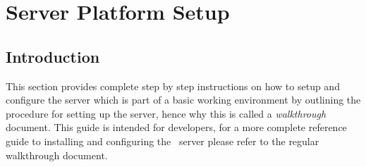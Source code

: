 \chapter{\cernvmreleasetesting Server Platform Setup}
\label{sec:serversetup}

\section{Introduction}
This section provides complete step by step instructions on how to setup and configure the \tapper server which is part of a basic 
working \releasetesting environment by outlining the procedure for setting up the server, hence why this is called a \emph{walkthrough} 
document. This guide is intended for developers, for a more complete reference guide to installing and configuring the \tapper~server
please refer to the regular walkthrough document.